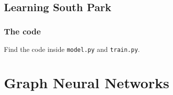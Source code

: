 \documentclass{article}
\begin{document}
\subsection{Learning South Park}
\subsubsection{The code}
Find the code inside \texttt{model.py} and \texttt{train.py}.

\subsubsection{}
\subsubsection{}
\subsection{}

\section{Graph Neural Networks}
\subsection{}
\subsubsection{}
\subsubsection{}
\subsection{}
\subsection{}
\subsubsection{}
\subsubsection{}



\end{document}
